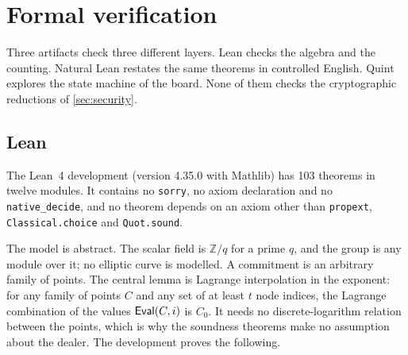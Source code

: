 \section{Formal verification}\label{sec:formal}

Three artifacts check three different layers. Lean checks the algebra and the counting. Natural Lean restates the same theorems in controlled English. Quint explores the state machine of the board. None of them checks the cryptographic reductions of \cref{sec:security}.

\subsection{Lean}

The Lean~4 development (version 4.35.0 with Mathlib) has 103 theorems in twelve modules. It contains no \texttt{sorry}, no axiom declaration and no \texttt{native\_decide}, and no theorem depends on an axiom other than \texttt{propext}, \texttt{Classical.choice} and \texttt{Quot.sound}.

The model is abstract. The scalar field is $\mathbb{Z}/q$ for a prime $q$, and the group is any module over it; no elliptic curve is modelled. A commitment is an arbitrary family of points. The central lemma is Lagrange interpolation in the exponent: for any family of points $C$ and any set of at least $t$ node indices, the Lagrange combination of the values $\mathsf{Eval}(C, i)$ is $C_0$. It needs no discrete-logarithm relation between the points, which is why the soundness theorems make no assumption about the dealer. The development proves the following.

